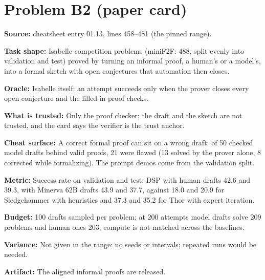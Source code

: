 \documentclass[11pt]{article}
\begin{document}
\section*{Problem B2 (paper card)}\label{ans:B2}
\begin{answer}
\textbf{Source:} cheatsheet entry 01.13, lines 458--481 (the pinned range).

\textbf{Task shape:} Isabelle competition problems (miniF2F: 488, split evenly into
validation and test) proved by turning an informal proof, a human's or a
model's, into a formal sketch with open conjectures that automation then
closes.

\textbf{Oracle:} Isabelle itself: an attempt succeeds only when the prover closes
every open conjecture and the filled-in proof checks.

\textbf{What is trusted:} Only the proof checker; the draft and the sketch are not trusted,
and the card says the verifier is the trust anchor.

\textbf{Cheat surface:} A correct formal proof can sit on a wrong draft: of 50 checked model
drafts behind valid proofs, 21 were flawed (13 solved by the prover alone, 8
corrected while formalizing). The prompt demos come from the validation
split.

\textbf{Metric:} Success rate on validation and test: DSP with human drafts 42.6 and
39.3, with Minerva 62B drafts 43.9 and 37.7, against 18.0 and 20.9 for
Sledgehammer with heuristics and 37.3 and 35.2 for Thor with expert
iteration.

\textbf{Budget:} 100 drafts sampled per problem; at 200 attempts model drafts solve
209 problems and human ones 203; compute is not matched across the
baselines.

\textbf{Variance:} Not given in the range: no seeds or intervals; repeated runs would
be needed.

\textbf{Artifact:} The aligned informal proofs are released.
\end{answer}
\end{document}
